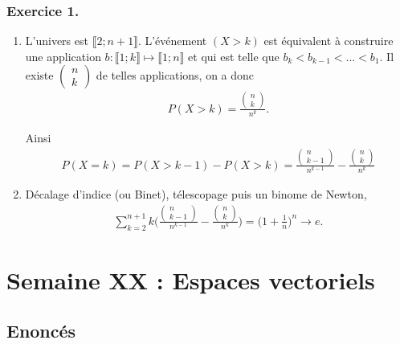 \documentclass{article}
\begin{document}
\subsubsection*{Exercice 1.}
\begin{enumerate}
\item L'univers est $\llbracket 2;n+1\rrbracket$. L'événement $(X>k)$ est équivalent à construire une application $b : \llbracket 1;k\rrbracket \mapsto\llbracket 1;n\rrbracket$ et qui est telle que $b_{k}<b_{k-1}<...<b_1$.
Il existe $\begin{pmatrix}n\\k\end{pmatrix}$ de telles applications, on a donc 
\begin{align*}
P(X>k) = \frac{\begin{pmatrix}n\\k \end{pmatrix}}{n^k}.
\end{align*}

Ainsi 
\begin{align*}
P(X=k) = P(X>k-1)-P(X>k)= \frac{\begin{pmatrix}n \\k-1\end{pmatrix}}{n^{k-1}}-\frac{\begin{pmatrix}n\\k \end{pmatrix}}{n^k}
\end{align*}
\item Décalage d'indice (ou Binet), télescopage puis un binome de Newton, 
\begin{align*}
\sum_{k=2}^{n+1}{k\bigg( \frac{\begin{pmatrix}n \\k-1\end{pmatrix}}{n^{k-1}}-\frac{\begin{pmatrix}n\\k \end{pmatrix}}{n^k}\bigg)}=\bigg(1+\frac{1}{n}\bigg)^n\to e.
\end{align*}
\end{enumerate}
\newpage{}
\section{Semaine XX : Espaces vectoriels}
\subsection*{Enoncés}
\end{document}
